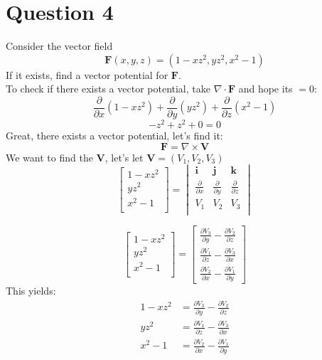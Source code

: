 \documentclass[12pt]{article}
\newcommand{\vect}[1]{\boldsymbol{#1}}
\begin{document}
\section*{Question 4}
Consider the vector field
$$
\vect{F}(x,y,z)= (1-xz^2, yz^2, x^2-1)
$$
If it exists, find a vector potential for $\vect{F}$.\\
\medskip
To check if there exists a vector potential, take $\nabla \cdot \vect{F}$ and hope its $=0$:
$$
\frac{\partial}{\partial x}(1-xz^2)+\frac{\partial}{\partial y}(yz^2)+\frac{\partial}{\partial z}(x^2-1)
$$
$$
-z^2+z^2+0 = 0 
$$
Great, there exists a vector potential, let's find it:\\
$$
\vect{F}=\nabla \times \vect{V}
$$
We want to find the $\vect{V}$, let's let $\vect{V}=(V_1, V_2, V_3)$
$$
\begin{bmatrix}
	1-xz^2 \\
	yz^2 \\
	x^2-1 \\
\end{bmatrix}
=
\begin{vmatrix}
	\vect{i} & \vect{j} & \vect{k} \\
	\frac{\partial}{\partial x} & \frac{\partial}{\partial y} & \frac{\partial}{\partial z} \\
	V_1 & V_2 & V_3 \\
\end{vmatrix}
$$

$$
\begin{bmatrix}
	1-xz^2 \\
	yz^2 \\
	x^2-1 \\
\end{bmatrix}
=
\begin{bmatrix}
	\frac{\partial V_3}{\partial y} - \frac{\partial V_2}{\partial z} \\
	\frac{\partial V_1}{\partial z} - \frac{\partial V_3}{\partial x} \\
	\frac{\partial V_2}{\partial x} - \frac{\partial V_1}{\partial y}
\end{bmatrix}
$$
This yields:
\begin{align}
	1-xz^2 &= \frac{\partial V_3}{\partial y} - \frac{\partial V_2}{\partial z} \\
	yz^2 &= \frac{\partial V_1}{\partial z} - \frac{\partial V_3}{\partial x} \\
	x^2-1 &= \frac{\partial V_2}{\partial x} - \frac{\partial V_1}{\partial y}
\end{align}
\end{document}
